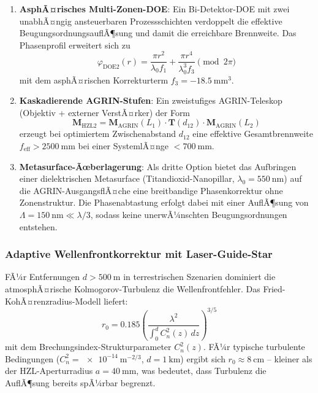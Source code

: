 ﻿\documentclass[12pt,a4paper]{article}
\theoremstyle{definition}
\newcommand{\eff}{\mathrm{eff}}
\newcommand{\AGRIN}{\mathrm{AGRIN}}
\begin{document}
	\begin{enumerate}[label=(\alph*)]
		\item \textbf{AsphÃ¤risches Multi-Zonen-DOE}: Ein Bi-Detektor-DOE mit
		zwei unabhÃ¤ngig ansteuerbaren Prozessschichten verdoppelt die
		effektive BeugungsordnungsauflÃ¶sung und damit die erreichbare
		Brennweite.  Das Phasenprofil erweitert sich zu
		\begin{equation}
			\varphi_\mathrm{DOE2}(r)
			= \frac{\pi r^2}{\lambda_0 f_1}
			+ \frac{\pi r^4}{\lambda_0^3 f_3}
			\pmod{2\pi}
			\label{eq:doe2_phase}
		\end{equation}
		mit dem asphÃ¤rischen Korrekturterm $f_3 = \SI{-18.5}{\milli\metre\cubed}$.

		\item \textbf{Kaskadierende AGRIN-Stufen}: Ein zweistufiges
		AGRIN-Teleskop (Objektiv + externer VerstÃ¤rker) der Form
		\begin{equation}
			\mathbf{M}_\mathrm{HZL2}
			= \mathbf{M}_\AGRIN(L_1)\cdot\mathbf{T}(d_{12})\cdot\mathbf{M}_\AGRIN(L_2)
		\end{equation}
		erzeugt bei optimiertem Zwischenabstand $d_{12}$ eine effektive
		Gesamtbrennweite $f_\eff > \SI{2500}{\milli\metre}$ bei einer
		SystemlÃ¤nge $< \SI{700}{\milli\metre}$.

		\item \textbf{Metasurface-Ãœberlagerung}: Als dritte Option bietet
		das Aufbringen einer dielektrischen Metasurface (Titandioxid-Nanopillar,
		$\lambda_0 = \SI{550}{\nano\metre}$) auf die AGRIN-AusgangsflÃ¤che
		eine breitbandige Phasenkorrektur ohne Zonenstruktur.  Die
		Phasenabtastung erfolgt dabei mit einer AuflÃ¶sung von
		$\Lambda = \SI{150}{\nano\metre} \ll \lambda/3$, sodass keine
		unerwÃ¼nschten Beugungsordnungen entstehen.
	\end{enumerate}

	\subsubsection{Adaptive Wellenfrontkorrektur mit Laser-Guide-Star}

	FÃ¼r Entfernungen $d > \SI{500}{\metre}$ in terrestrischen Szenarien
	dominiert die atmosphÃ¤rische Kolmogorov-Turbulenz die
	Wellenfrontfehler.  Das Fried-KohÃ¤renzradius-Modell liefert:
	\begin{equation}
		r_0 = 0.185\!\left(\frac{\lambda^2}{\int_0^d C_n^2(z)\,dz}\right)^{3/5}
		\label{eq:fried}
	\end{equation}
	mit dem Brechungsindex-Strukturparameter $C_n^2(z)$.  FÃ¼r typische
	turbulente Bedingungen ($C_n^2 = \SI{e-14}{\metre^{-2/3}}$,
	$d = \SI{1}{\kilo\metre}$) ergibt sich $r_0 \approx \SI{8}{\centi\metre}$
	-- kleiner als der HZL-Aperturradius $a = \SI{40}{\milli\metre}$, was
	bedeutet, dass Turbulenz die AuflÃ¶sung bereits spÃ¼rbar begrenzt.
\end{document}
